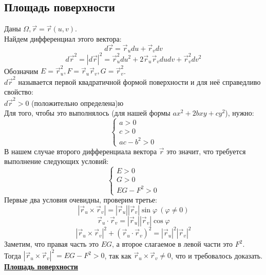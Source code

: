 \documentclass[12pt]{article}
\begin{document}
\subsection{Площадь поверхности}
Даны $\Omega, \overrightarrow{r}=\overrightarrow{r}(u,v)$.\\
Найдем дифференциал этого вектора:\\
$$d \overrightarrow{r} = \overrightarrow{r}_u du + \overrightarrow{r}_v dv$$
$$d \overrightarrow{r}^2 = |d \overrightarrow{r}|^2 = \overrightarrow{r}_u^2 du^2 + 2 \overrightarrow{r}_u \overrightarrow{r}_v dudv + \overrightarrow{r}_v^2 dv^2$$
Обозначим $E = \overrightarrow{r}_u^2, F = \overrightarrow{r}_u \overrightarrow{r}_v, G = \overrightarrow{r}_v^2$.\\
$d \overrightarrow{r}^2$ называется первой квадратичной формой поверхности и для неё справедливо свойство:\\
$d \overrightarrow{r}^2 > 0$ (положительно определена)ю\\
Для того, чтобы это выполнялось (для нашей формы $ax^2 + 2bxy + cy^2$), нужно:\\
$$\begin{cases} a > 0 \\ c > 0 \\ ac - b^2 > 0 \end{cases}$$
В нашем случае второго дифференциала вектора $\overrightarrow{r}$ это значит, что требуется выполнение следующих условий:\\
$$\begin{cases} E > 0 \\ G > 0 \\ EG - F^2 > 0 \end{cases}$$
Первые два условия очевидны, проверим третье:\\
$$| \overrightarrow{r}_u \times \overrightarrow{r}_v | = |\overrightarrow{r}_u| |\overrightarrow{r}_v| \sin \varphi \  (\varphi \neq 0)$$
$$\overrightarrow{r}_u \cdot \overrightarrow{r}_v = |\overrightarrow{r}_u| |\overrightarrow{r}_v| \cos \varphi$$
$$|\overrightarrow{r}_u \times \overrightarrow{r}_v|^2 + (\overrightarrow{r}_u \cdot \overrightarrow{r}_v)^2 = |\overrightarrow{r}_u|^2 |\overrightarrow{r}_v|^2$$
Заметим, что правая часть это $EG$, а второе слагаемое в левой части это $F^2$.\\
Тогда $|\overrightarrow{r}_u \times \overrightarrow{r}_v|^2 = EG-F^2 > 0$, так как $\overrightarrow{r}_u \times \overrightarrow{r}_v \neq 0$, что и требовалось доказать.\\
\uline{\textbf{Площадь поверхности}}\\\\
\end{document}
